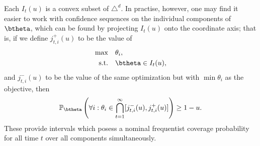 \documentclass[11pt]{article}
\begin{document}
\noindent Each $I_t(u)$ is a convex subset of $\triangle^d$. 
In practise, however, one may find it easier to work with confidence sequences on the individual components of $\btheta$, which can be found by projecting $I_t(u)$ onto the coordinate axis; that is, if we define $j_{t,i}^+(u)$ to be the value of
\begin{align*}
  \max & \quad \theta_i, \\
  \text{s.t.} &\quad  \btheta \in I_t(u),\\
\end{align*}
and 
$j_{t,i}^-(u)$ to be the value of the same optimization but with $\min\theta_i$ as the objective, then 
\begin{equation}
  \label{eq:marginal_confidence_sequence}
  \mathbb{P}_{\btheta}\left(
    \forall i: \theta_i \in \bigcap_{t=1}^{\infty} [j_{t,i}^-(u),j_{t,i}^+(u)]
  \right) \geq 1- u.
\end{equation} 
\noindent These provide intervals which posess a nominal frequentist coverage probability for all time $t$ over all components simultaneously.
\end{document}
